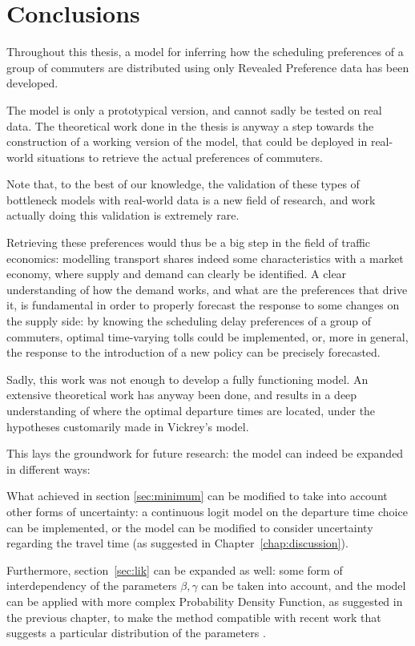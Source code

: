 \chapter{Conclusions}
\label{chap:conclusion}

Throughout this thesis, a model for inferring how the scheduling preferences of a group of commuters are distributed using only Revealed Preference data has been developed.

The model is only a prototypical version, and cannot sadly be tested on real data.
The theoretical work done in the thesis is anyway a step towards the construction of a working version of the model,
that could be deployed in real-world situations to retrieve the actual preferences of commuters.

Note that, to the best of our knowledge,
the validation of these types of bottleneck models with real-world data is a new field of research,
and work actually doing this validation is extremely rare.

Retrieving these preferences would thus be a big step in the field of traffic economics:
modelling transport shares indeed some characteristics with a market economy,
where supply and demand can clearly be identified.
A clear understanding of how the demand works, and what are the preferences that drive it,
is fundamental in order to properly forecast the response to some changes on the supply side:
by knowing the scheduling delay preferences of a group of commuters,
optimal time-varying tolls could be implemented,
or, more in general, the response to the introduction of a new policy can be precisely forecasted.

Sadly, this work was not enough to develop a fully functioning model.
An extensive theoretical work has anyway been done,
and results in a deep understanding of where the optimal departure times are located,
under the hypotheses customarily made in Vickrey's model.

This lays the groundwork for future research:
the model can indeed be expanded in different ways:

What achieved in section \ref{sec:minimum} can be modified to take into account other forms of uncertainty:
a continuous logit model on the departure time choice can be implemented,
or the model can be modified to consider uncertainty regarding the travel time (as suggested in Chapter~\ref{chap:discussion}).

Furthermore, section~\ref{sec:lik} can be expanded as well:
some form of interdependency of the parameters \(\beta, \gamma\) can be taken into account,
and the model can be applied with more complex Probability Density Function,
as suggested in the previous chapter,
to make the method compatible with recent work that suggests a particular distribution of the parameters \parencite{https://doi.org/10.1111/iere.12692}.

